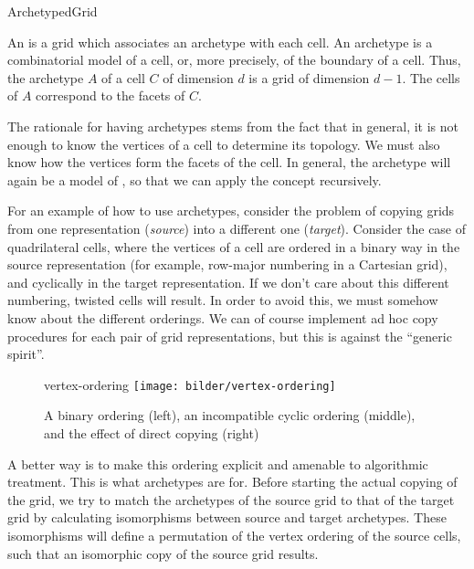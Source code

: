 \begin{Label}{ArchetypedGrid}
\end{Label}

An  is a grid which associates
an archetype with each cell. 
An archetype is a combinatorial model of a cell,
or, more precisely, of the boundary of a cell. 
Thus, the archetype $A$ of a cell $C$ of dimension $d$ is a grid of
dimension $d-1$. The cells of $A$ correspond to the facets of $C$.

The rationale for having archetypes stems from the fact that in general, 
it is not enough to know the vertices of a cell to determine its topology.
We must also know how the vertices form the facets of the cell.
In general, the archetype will again be a model of ,
so that we can apply the concept recursively.

For an example of how to use archetypes, consider the problem of copying grids
from one representation (\emph{source}) into a different one (\emph{target}). 
Consider the case of quadrilateral cells, 
where the vertices of a cell are ordered in a binary way in the source representation 
(for example, row-major numbering in a Cartesian grid), 
and cyclically in the target representation.
If we don't care about this different numbering, twisted cells will result.
In order to avoid this, we must somehow know about the different orderings.
We can of course implement ad hoc copy procedures for each pair of grid representations,
but this is against the ``generic spirit''. 

  \begin{figure}[h]
     \begin{center}
       \begin{Label}{vertex-ordering}
       \T\texttt{[image: bilder/vertex-ordering]}
       \W{}
        \caption{A binary ordering (left), an incompatible cyclic ordering (middle), 
                 and the effect of direct copying (right)}
        \end{Label}
     \end{center}
   \end{figure}

A better way is to make this ordering explicit and amenable to algorithmic treatment.
This is what archetypes are for.
Before starting the actual copying of the grid, 
we try to match the archetypes of the source grid to that of the target grid
by calculating isomorphisms between source and target archetypes.
These isomorphisms will define a permutation of the vertex ordering of the source cells,
such that an isomorphic copy of the source grid results.


